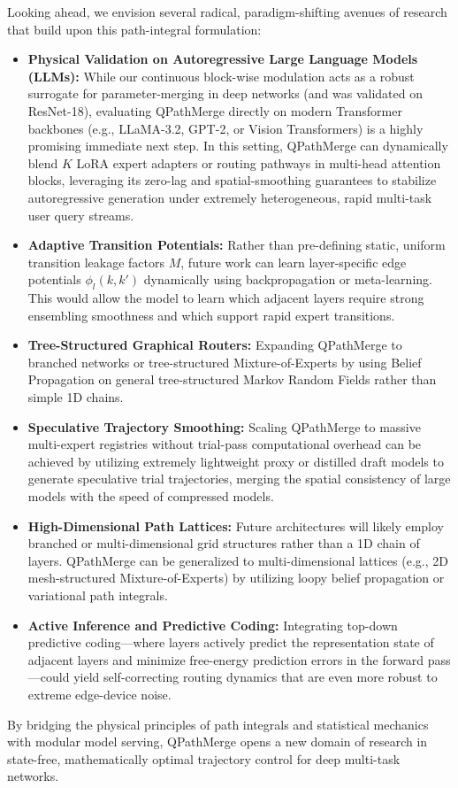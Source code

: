 Looking ahead, we envision several radical, paradigm-shifting avenues of research that build upon this path-integral formulation:
\begin{itemize}
    \item \textbf{Physical Validation on Autoregressive Large Language Models (LLMs):} While our continuous block-wise modulation acts as a robust surrogate for parameter-merging in deep networks (and was validated on ResNet-18), evaluating QPathMerge directly on modern Transformer backbones (e.g., LLaMA-3.2, GPT-2, or Vision Transformers) is a highly promising immediate next step. In this setting, QPathMerge can dynamically blend $K$ LoRA expert adapters or routing pathways in multi-head attention blocks, leveraging its zero-lag and spatial-smoothing guarantees to stabilize autoregressive generation under extremely heterogeneous, rapid multi-task user query streams.
    \item \textbf{Adaptive Transition Potentials:} Rather than pre-defining static, uniform transition leakage factors $M$, future work can learn layer-specific edge potentials $\phi_l(k, k')$ dynamically using backpropagation or meta-learning. This would allow the model to learn which adjacent layers require strong ensembling smoothness and which support rapid expert transitions.
    \item \textbf{Tree-Structured Graphical Routers:} Expanding QPathMerge to branched networks or tree-structured Mixture-of-Experts by using Belief Propagation on general tree-structured Markov Random Fields rather than simple 1D chains.
    \item \textbf{Speculative Trajectory Smoothing:} Scaling QPathMerge to massive multi-expert registries without trial-pass computational overhead can be achieved by utilizing extremely lightweight proxy or distilled draft models to generate speculative trial trajectories, merging the spatial consistency of large models with the speed of compressed models.
    \item \textbf{High-Dimensional Path Lattices:} Future architectures will likely employ branched or multi-dimensional grid structures rather than a 1D chain of layers. QPathMerge can be generalized to multi-dimensional lattices (e.g., 2D mesh-structured Mixture-of-Experts) by utilizing loopy belief propagation or variational path integrals.
    \item \textbf{Active Inference and Predictive Coding:} Integrating top-down predictive coding—where layers actively predict the representation state of adjacent layers and minimize free-energy prediction errors in the forward pass—could yield self-correcting routing dynamics that are even more robust to extreme edge-device noise.
\end{itemize}
By bridging the physical principles of path integrals and statistical mechanics with modular model serving, QPathMerge opens a new domain of research in state-free, mathematically optimal trajectory control for deep multi-task networks.
